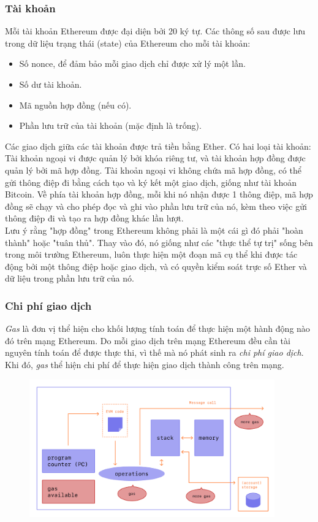 \subsubsection*{Tài khoản}

Mỗi tài khoản Ethereum được đại diện bởi 20 ký tự. Các thông số sau được lưu trong dữ liệu trạng thái (state) của Ethereum cho mỗi tài khoản:
\begin{itemize}
    \item Số nonce, để đảm bảo mỗi giao dịch chỉ được xử lý một lần.
    \item Số dư tài khoản.
    \item Mã nguồn hợp đồng (nếu có).
    \item Phần lưu trữ của tài khoản (mặc định là trống).
\end{itemize}

Các giao dịch giữa các tài khoản được trả tiền bằng Ether. Có hai loại tài khoản: Tài khoản ngoại vi được quản lý bởi khóa riêng tư, và tài khoản hợp đồng được quản lý bởi mã hợp đồng. Tài khoản ngoại vi không chứa mã hợp đồng, có thể gửi thông điệp đi bằng cách tạo và ký kết một giao dịch, giống như tài khoản Bitcoin. Về phía tài khoản hợp đồng, mỗi khi nó nhận được 1 thông điệp, mã hợp đồng sẽ chạy và cho phép đọc và ghi vào phần lưu trữ của nó, kèm theo việc gửi thông điệp đi và tạo ra hợp đồng khác lần lượt.\\

Lưu ý rằng "hợp đồng" trong Ethereum không phải là một cái gì đó phải "hoàn thành" hoặc "tuân thủ". Thay vào đó, nó giống như các "thực thể tự trị" sống bên trong môi trường Ethereum, luôn thực hiện một đoạn mã cụ thể khi được tác động bởi một thông điệp hoặc giao dịch, và có quyền kiểm soát trực số Ether và dữ liệu trong phần lưu trữ của nó.

\subsubsection*{Chi phí giao dịch}

\textit{Gas} là đơn vị thể hiện cho khối lượng tính toán để thực hiện một hành động nào đó trên mạng Ethereum. Do mỗi giao dịch trên mạng Ethereum đều cần tài nguyên tính toán để được thực thi, vì thế mà nó phát sinh ra \textit{chi phí giao dịch}. Khi đó, \textit{gas} thể hiện chi phí để thực hiện giao dịch thành công trên mạng.\\

\begin{figure}[ht]
    \centering
    \includegraphics[width=400px]{images/gas.png}
\end{figure}

